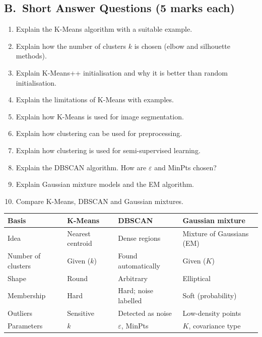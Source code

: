 \subsection*{B.\ Short Answer Questions (5 marks each)}
\begin{enumerate}
  \item Explain the K-Means algorithm with a suitable example. 
  \item Explain how the number of clusters $k$ is chosen (elbow and silhouette methods). 
  \item Explain K-Means++ initialisation and why it is better than random initialisation. 
  \item Explain the limitations of K-Means with examples. 
  \item Explain how K-Means is used for image segmentation. 
  \item Explain how clustering can be used for preprocessing. 
  \item Explain how clustering is used for semi-supervised learning. 
  \item Explain the DBSCAN algorithm. How are $\varepsilon$ and MinPts chosen? 
  \item Explain Gaussian mixture models and the EM algorithm. 
  \item Compare K-Means, DBSCAN and Gaussian mixtures. 
\end{enumerate}

\begin{modelans}
\begin{center}\small
\begin{tabular}{@{}p{2.6cm}p{3.5cm}p{3.5cm}p{3.5cm}@{}}
\toprule
\textbf{Basis} & \textbf{K-Means} & \textbf{DBSCAN} & \textbf{Gaussian mixture}\\
\midrule
Idea & Nearest centroid & Dense regions & Mixture of Gaussians (EM)\\
Number of clusters & Given ($k$) & Found automatically & Given ($K$)\\
Shape & Round & Arbitrary & Elliptical\\
Membership & Hard & Hard; noise labelled & Soft (probability)\\
Outliers & Sensitive & Detected as noise & Low-density points\\
Parameters & $k$ & $\varepsilon$, MinPts & $K$, covariance type\\
\bottomrule
\end{tabular}
\end{center}
\end{modelans}

